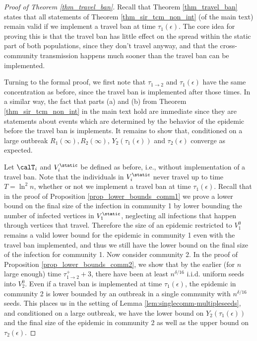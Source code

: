 \documentclass[11pt]{article}
\begin{document}
\begin{proof}[Proof of Theorem \ref{thm_travel_ban}]
Recall that Theorem \ref{thm_travel_ban} states that all statements of Theorem \ref{thm_sir_tcm_non_int} (of the main text) remain valid if we implement a travel ban at time $\tau_1(\epsilon)$. The core idea for proving this is that the travel ban has little effect on the spread within the static part of both populations, since they don't travel anyway, and that the cross-community transmission  happens much sooner than the travel ban can be implemented.

Turning to the formal proof, we first note that $\tau_{1\to 2}$ and $\tau_1(\epsilon)$ have the same concentration as before, since the travel ban is implemented after those times. In a similar way, the fact that parts (a) and (b) from Theorem \ref{thm_sir_tcm_non_int} in the main text hold are immediate since they are statements about events which are determined by the behavior of the epidemic before the travel ban is implements. It remains to show that, conditioned on a large outbreak $R_1(\infty), R_2(\infty)$, $Y_2(\tau_1(\epsilon))$ and $\tau_2(\epsilon)$ converge as expected.   
  
Let $\calT_i$ and $V_i^\static$ be defined as before, i.e., without implementation of a travel ban.  Note that the individuals in  $V_i^\static$ never travel up to time $T=\ln^2n$, whether or not we implement a travel ban at time $\tau_1(\epsilon)$. Recall that in the proof of Proposition \ref{prop_lower_bounds_comm1} we prove a lower bound on the final size of the infection in community 1 by lower bounding the number of infected vertices in $V_1^\static$, neglecting all infections that happen %
through vertices that travel. Therefore the size of an epidemic restricted to $V_1^0$ remains a valid lower bound for the epidemic in community 1 even with the travel ban implemented, and thus we still have the lower bound on the final size of the infection for community 1. Now consider community 2. In the proof of Proposition \ref{prop_lower_bounds_comm2}, we show that by the earlier (for $n$ large enough) time $\tau_{1\to 2}^+ + 3$, there have been at least $n^{\delta/16}$ i.i.d. uniform seeds into $V_2^0$. Even if a travel ban is implemented at time $\tau_1(\epsilon)$, the epidemic in community 2 is lower bounded by an outbreak in a single community with $n^{\delta/16}$ seeds. This places us in the setting of Lemma \ref{lem:singlecomm-multipleseeds}, and conditioned on a large outbreak, we have the lower bound on $Y_2(\tau_1(\epsilon))$ and the final size of the epidemic in community 2 as well as the upper bound on $\tau_2(\epsilon)$.


\end{proof}
\end{document}
